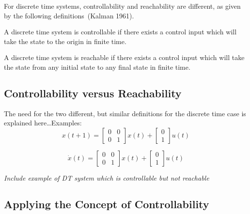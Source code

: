 For discrete time systems, controllability and reachability are different, as given by the following definitions\ (Kalman 1961).

\begin{defn-dan}[Controllability (DT)]
  A discrete time system is controllable if there exists a control input which will take the state to the origin in finite time.
\end{defn-dan}

\begin{defn-dan}[Reachability (DT)]
  A discrete time system is reachable if there exists a control input which will take the state from any initial state to any final state in finite time.
\end{defn-dan}

\subsection{Controllability versus Reachability}

The need for the two different, but similar definitions for the discrete time case is explained here\dots Examples:
\begin{equation*}
  x(t+1)=
  \left[
    \begin{array}{cc}
      0 & 0 \\ 0 & 1
    \end{array}
  \right]
  x(t)+
  \left[
    \begin{array}{c}
      0  \\  1
    \end{array}
  \right]
  u(t)
\end{equation*}

\begin{equation*}
  \dot{x}(t)=
  \left[
    \begin{array}{cc}
      0 & 0 \\ 0 & 1
    \end{array}
  \right]
  x(t)+
  \left[
    \begin{array}{c}
      0 \\ 1
    \end{array}
  \right]
  u(t)
\end{equation*}

\textit{Include example of DT system which is controllable but not reachable}

\subsection{Applying the Concept of Controllability}

